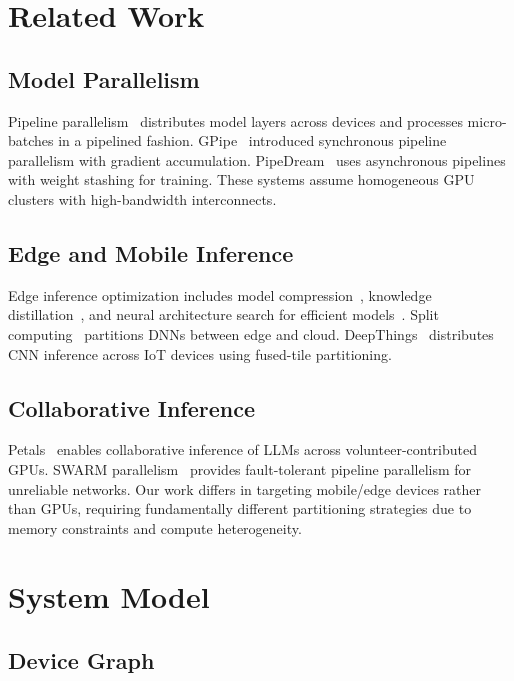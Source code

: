 \documentclass[11pt,a4paper]{article}
\begin{document}
\section{Related Work}

\subsection{Model Parallelism}

Pipeline parallelism~\citep{huang2019gpipe,narayanan2019pipedream} distributes model layers across devices and processes micro-batches in a pipelined fashion. GPipe~\citep{huang2019gpipe} introduced synchronous pipeline parallelism with gradient accumulation. PipeDream~\citep{narayanan2019pipedream} uses asynchronous pipelines with weight stashing for training. These systems assume homogeneous GPU clusters with high-bandwidth interconnects.

\subsection{Edge and Mobile Inference}

Edge inference optimization includes model compression~\citep{han2016deep}, knowledge distillation~\citep{hinton2015distilling}, and neural architecture search for efficient models~\citep{cai2019once}. Split computing~\citep{kang2017neurosurgeon} partitions DNNs between edge and cloud. DeepThings~\citep{zhao2018deepthings} distributes CNN inference across IoT devices using fused-tile partitioning.

\subsection{Collaborative Inference}

Petals~\citep{borzunov2023petals} enables collaborative inference of LLMs across volunteer-contributed GPUs. SWARM parallelism~\citep{ryabinin2023swarm} provides fault-tolerant pipeline parallelism for unreliable networks. Our work differs in targeting mobile/edge devices rather than GPUs, requiring fundamentally different partitioning strategies due to memory constraints and compute heterogeneity.

\section{System Model}

\subsection{Device Graph}
\end{document}
